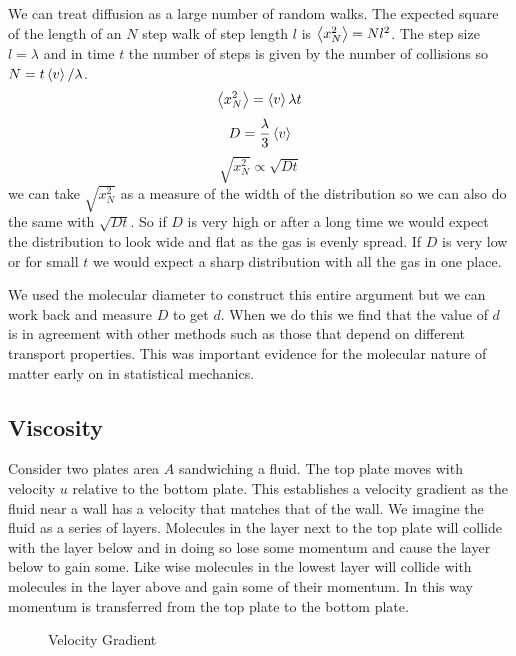\documentclass{article}
\begin{document}
    We can treat diffusion as a large number of random walks.
    The expected square of the length of an \(N\) step walk of step length \(l\) is \(\left\langle{x_N^2}\right\rangle = Nl^2\).
    The step size \(l = \lambda\) and in time \(t\) the number of steps is given by the number of collisions so \(N = t\left\langle{v}\right\rangle/\lambda\).
    \[\left\langle{x_N^2}\right\rangle = \left\langle{v}\right\rangle\lambda t\]
    \[D = \frac{\lambda}{3}\left\langle{v}\right\rangle\]
    \[\sqrt{{x_N^2}} \propto \sqrt{Dt}\]
    we can take \(\sqrt{x_N^2}\) as a measure of the width of the distribution so we can also do the same with \(\sqrt{Dt}\).
    So if \(D\) is very high or after a long time we would expect the distribution to look wide and flat as the gas is evenly spread.
    If \(D\) is very low or for small \(t\) we would expect a sharp distribution with all the gas in one place.
    
    We used the molecular diameter to construct this entire argument but we can work back and measure \(D\) to get \(d\).
    When we do this we find that the value of \(d\) is in agreement with other methods such as those that depend on different transport properties.
    This was important evidence for the molecular nature of matter early on in statistical mechanics.
    
    \subsection{Viscosity}
    Consider two plates area \(A\) sandwiching a fluid.
    The top plate moves with velocity \(u\) relative to the bottom plate.
    This establishes a velocity gradient as the fluid near a wall has a velocity that matches that of the wall.
    We imagine the fluid as a series of layers.
    Molecules in the layer next to the top plate will collide with the layer below and in doing so lose some momentum and cause the layer below to gain some.
    Like wise molecules in the lowest layer will collide with molecules in the layer above and gain some of their momentum.
    In this way momentum is transferred from the top plate to the bottom plate.
    
    \begin{figure}[ht]
        \centering
        \caption{Velocity Gradient}
    \end{figure}
    
\end{document}
